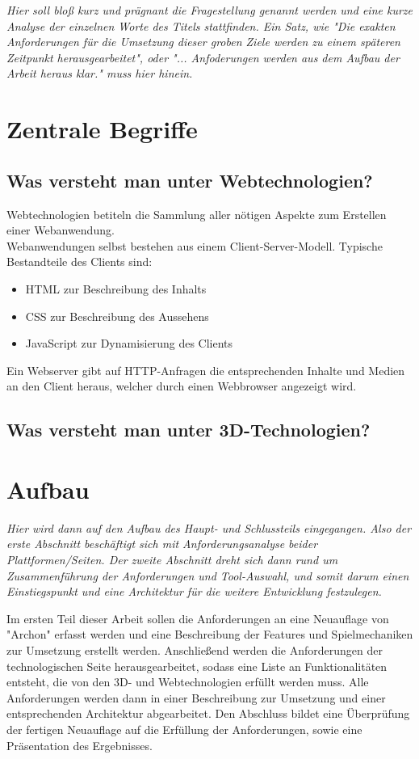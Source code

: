 \emph{Hier soll bloß kurz und prägnant die Fragestellung genannt werden und eine kurze Analyse der einzelnen Worte des Titels stattfinden. Ein Satz, wie "Die exakten Anforderungen für die Umsetzung dieser groben Ziele werden zu einem späteren Zeitpunkt herausgearbeitet", oder "... Anfoderungen werden aus dem Aufbau der Arbeit heraus klar." muss hier hinein.}

\section{Zentrale Begriffe}
\label{sec:zentrale_begriffe}

\subsection{Was versteht man unter Webtechnologien?}
Webtechnologien betiteln die Sammlung aller nötigen Aspekte zum Erstellen einer Webanwendung.\\
Webanwendungen selbst bestehen aus einem Client-Server-Modell.
Typische Bestandteile des Clients sind: 
\begin{itemize}
	\item HTML zur Beschreibung des Inhalts
	\item CSS zur Beschreibung des Aussehens
	\item JavaScript zur Dynamisierung des Clients
\end{itemize}
Ein Webserver gibt auf HTTP-Anfragen die entsprechenden Inhalte und Medien an den Client heraus, welcher durch einen Webbrowser angezeigt wird.
\subsection{Was versteht man unter 3D-Technologien?}

\section{Aufbau}
\label{sec:aufbau}

\emph{Hier wird dann auf den Aufbau des Haupt- und Schlussteils eingegangen. Also der erste Abschnitt beschäftigt sich mit Anforderungsanalyse beider Plattformen/Seiten. Der zweite Abschnitt dreht sich dann rund um Zusammenführung der Anforderungen und Tool-Auswahl, und somit darum einen Einstiegspunkt und eine Architektur für die weitere Entwicklung festzulegen. }

Im ersten Teil dieser Arbeit sollen die Anforderungen an eine Neuauflage von "Archon" erfasst werden und eine Beschreibung der Features und Spielmechaniken zur Umsetzung erstellt werden.
Anschließend werden die Anforderungen der technologischen Seite herausgearbeitet, sodass eine Liste an Funktionalitäten entsteht, die von den 3D- und Webtechnologien erfüllt werden muss.
Alle Anforderungen werden dann in einer Beschreibung zur Umsetzung und einer entsprechenden Architektur abgearbeitet.
Den Abschluss bildet eine Überprüfung der fertigen Neuauflage auf die Erfüllung der Anforderungen, sowie eine Präsentation des Ergebnisses.